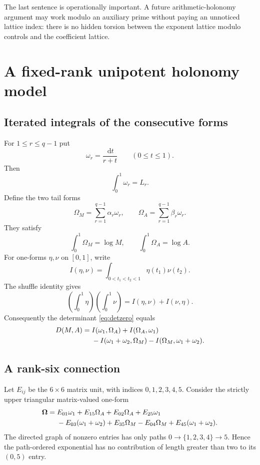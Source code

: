 \documentclass[11pt]{article}
\theoremstyle{definition}
\theoremstyle{remark}
\newcommand{\dd}{\,\mathrm d}
\begin{document}
The last sentence is operationally important.  A future arithmetic-holonomy
argument may work modulo an auxiliary prime without paying an unnoticed lattice
index: there is no hidden torsion between the exponent lattice modulo controls
and the coefficient lattice.

\section{A fixed-rank unipotent holonomy model}

\subsection{Iterated integrals of the consecutive forms}

For $1\le r\le q-1$ put
\begin{equation}\label{eq:omegar}
 \omega_r=\frac{\dd t}{r+t}
 \qquad(0\le t\le1).
\end{equation}
Then
\begin{equation}\label{eq:intomega}
 \int_0^1\omega_r=L_r.
\end{equation}
Define the two tail forms
\begin{equation}\label{eq:tailforms}
 \Omega_M=\sum_{r=1}^{q-1}\alpha_r\omega_r,
 \qquad
 \Omega_A=\sum_{r=1}^{q-1}\beta_r\omega_r.
\end{equation}
They satisfy
\[
 \int_0^1\Omega_M=\log M,
 \qquad
 \int_0^1\Omega_A=\log A.
\]
For one-forms $\eta,\nu$ on $[0,1]$, write
\begin{equation}\label{eq:iterated}
 I(\eta,\nu)=
 \int_{0<t_1<t_2<1}\eta(t_1)\nu(t_2).
\end{equation}
The shuffle identity gives
\begin{equation}\label{eq:shuffle}
 \left(\int_0^1\eta\right)\left(\int_0^1\nu\right)
 =I(\eta,\nu)+I(\nu,\eta).
\end{equation}
Consequently the determinant \eqref{eq:detzero} equals
\begin{align}
 D(M,A)={}&I(\omega_1,\Omega_A)+I(\Omega_A,\omega_1)\notag\\
 &-I(\omega_1+\omega_2,\Omega_M)
  -I(\Omega_M,\omega_1+\omega_2).
 \label{eq:Diterated}
\end{align}

\subsection{A rank-six connection}

Let $E_{ij}$ be the $6\times6$ matrix unit, with indices $0,1,2,3,4,5$.
Consider the strictly upper triangular matrix-valued one-form
\begin{align}
 \boldsymbol\Omega={}&
 E_{01}\omega_1+E_{15}\Omega_A
 +E_{02}\Omega_A+E_{25}\omega_1\notag\\
 &-E_{03}(\omega_1+\omega_2)+E_{35}\Omega_M
 -E_{04}\Omega_M+E_{45}(\omega_1+\omega_2).
 \label{eq:rank6connection}
\end{align}
The directed graph of nonzero entries has only paths
$0\to\{1,2,3,4\}\to5$.  Hence the path-ordered exponential has no contribution
of length greater than two to its $(0,5)$ entry.
\end{document}
